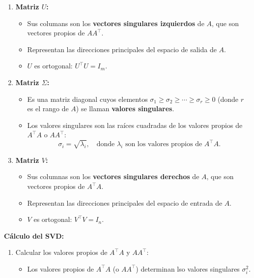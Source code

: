 \begin{enumerate}[label=\color{red}\textbf{\arabic*)}]
    \begin{enumerate}[label=\arabic*)]
        \item \textbf{Matriz $U$:}
            \begin{itemize}[label=\textbullet]
                \item Sus columans son los \textbf{vectores singulares izquierdos} de $A$, que son vectores propios de $A A^\intercal$.
                \item Representan las direcciones principales del espacio de salida de $A$.
                \item  $U$ es ortogonal:  $U^\intercal U=I_m$.
            \end{itemize}
        \item \textbf{Matriz $\Sigma$:}
            \begin{itemize}[label=\textbullet]
                \item Es una matriz diagonal cuyos elementos $\sigma_1\ge \sigma_2\ge \cdots\ge \sigma_r\ge 0$ (donde $r$ es el rango de  $A$) se llaman \textbf{valores singulares}.
                \item Los valores singulares son las raíces cuadradas de los valores propios de $A^\intercal A$ o $A A^\intercal$: \[
                \sigma_i=\sqrt{\lambda_i},\quad \text{donde $\lambda_i$ son los valores propios de  $A^\intercal A$.} 
                \] 
                \end{itemize}
            \item \textbf{Matriz $V$:}
                \begin{itemize}[label=\textbullet]
                    \item Sus columnas son los \textbf{vectores singulares derechos} de $A$, que son vectores propios de  $A^\intercal A$.
                    \item Representan las direcciones principales del espacio de entrada de $A$.
                    \item  $V$ es ortogonal:  $V^\intercal V=I_n$.
            \end{itemize}
    \end{enumerate}
\textbf{Cálculo del SVD:}
\begin{enumerate}[label=Paso \arabic*:]
    \item Calcular los valores propios de $A^\intercal A$ y $A A^\intercal$:
        \begin{itemize}[label=\textbullet]
            \item Los valores propios de $A^\intercal A$ (o $A A^\intercal$) determinan lso valores singulares $\sigma_i^2$.
                

\end{itemize}
\end{enumerate}
\end{enumerate}
